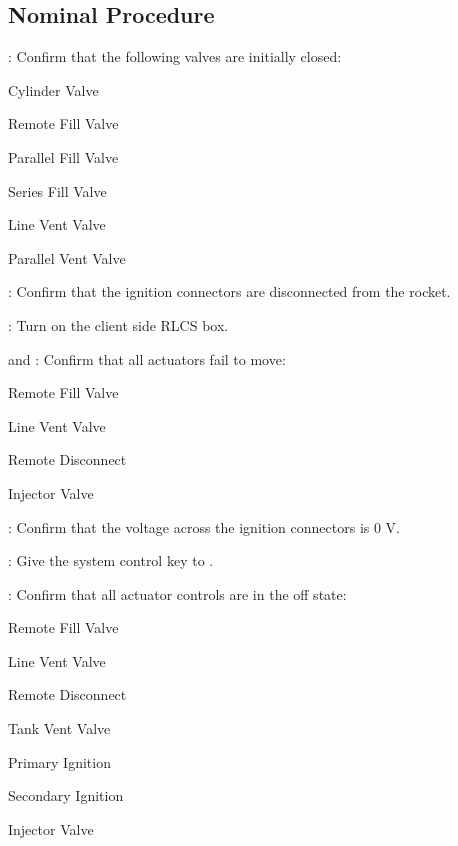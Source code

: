 \subsection{Nominal Procedure}
\begin{checklist}
    \item \primary{}: Confirm that the following valves are initially closed:
        \begin{checklist}
        \item Cylinder Valve
        \item Remote Fill Valve
        \item Parallel Fill Valve
        \item Series Fill Valve
        \item Line Vent Valve
        \item Parallel Vent Valve
    \end{checklist}
    \item \primary{}: Confirm that the ignition connectors are disconnected from the rocket.
    \item \control{}: Turn on the client side RLCS box.
    \item \control{} and \secondary: Confirm that all actuators fail to move:
    \begin{checklist}
        \item Remote Fill Valve
        \item Line Vent Valve
        \item Remote Disconnect
        \item Injector Valve
    \end{checklist}
    \item \secondary: Confirm that the voltage across the ignition connectors is 0 V.
    \item \ops: Give the system control key to \control{}.
    \item \control: Confirm that all actuator controls are in the off state:
    \begin{checklist}
        \item Remote Fill Valve
        \item Line Vent Valve
        \item Remote Disconnect
        \item Tank Vent Valve
        \item Primary Ignition
        \item Secondary Ignition
        \item Injector Valve
    \end{checklist}

\end{checklist}
